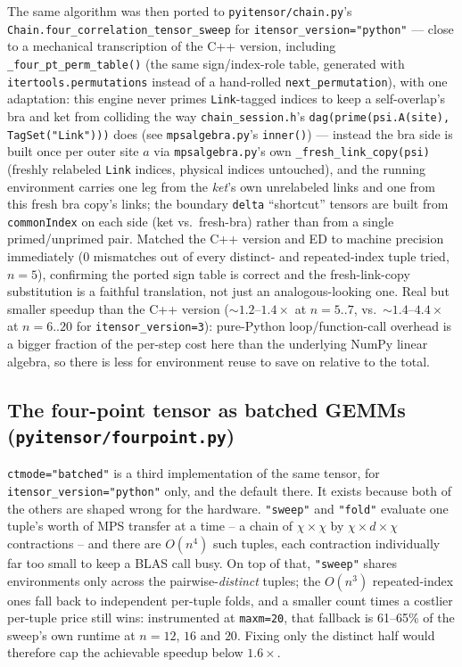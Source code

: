 \documentclass[11pt]{article}
\begin{document}
The same algorithm was then ported to \texttt{pyitensor/chain.py}'s
\texttt{Chain.four\_correlation\_tensor\_sweep} for
\texttt{itensor\_version="python"} --- close to a mechanical
transcription of the C++ version, including
\texttt{\_four\_pt\_perm\_table()} (the same sign/index-role table,
generated with \texttt{itertools.permutations} instead of a hand-rolled
\texttt{next\_permutation}), with one adaptation: this engine never
primes \texttt{Link}-tagged indices to keep a self-overlap's bra and ket
from colliding the way \texttt{chain\_session.h}'s
\texttt{dag(prime(psi.A(site), TagSet("Link")))} does (see
\texttt{mpsalgebra.py}'s \texttt{inner()}) --- instead the bra side is
built once per outer site $a$ via \texttt{mpsalgebra.py}'s own
\texttt{\_fresh\_link\_copy(psi)} (freshly relabeled \texttt{Link}
indices, physical indices untouched), and the running environment
carries one leg from the \emph{ket}'s own unrelabeled links and one from
this fresh bra copy's links; the boundary \texttt{delta} ``shortcut''
tensors are built from \texttt{commonIndex} on each side (ket vs.\
fresh-bra) rather than from a single primed/unprimed pair. Matched the
C++ version and ED to machine precision immediately (0 mismatches out of
every distinct- and repeated-index tuple tried, $n=5$), confirming the
ported sign table is correct and the fresh-link-copy substitution is a
faithful translation, not just an analogous-looking one. Real but
smaller speedup than the C++ version ($\sim1.2$--$1.4\times$ at
$n=5..7$, vs.\ $\sim1.4$--$4.4\times$ at $n=6..20$ for
\texttt{itensor\_version=3}): pure-Python loop/function-call overhead is
a bigger fraction of the per-step cost here than the underlying NumPy
linear algebra, so there is less for environment reuse to save on
relative to the total.

\subsection{The four-point tensor as batched GEMMs
(\texttt{pyitensor/fourpoint.py})}

\texttt{ctmode="batched"} is a third implementation of the same tensor, for
\texttt{itensor\_version="python"} only, and the default there. It exists
because both of the others are shaped wrong for the hardware.
\texttt{"sweep"} and \texttt{"fold"} evaluate one tuple's worth of MPS
transfer at a time -- a chain of $\chi\times\chi$ by $\chi\times d\times\chi$
contractions -- and there are $O(n^4)$ such tuples, each contraction
individually far too small to keep a BLAS call busy. On top of that,
\texttt{"sweep"} shares environments only across the pairwise-\emph{distinct}
tuples; the $O(n^3)$ repeated-index ones fall back to independent per-tuple
folds, and a smaller count times a costlier per-tuple price still wins:
instrumented at \texttt{maxm=20}, that fallback is 61--65\% of the sweep's
own runtime at $n=12$, $16$ and $20$. Fixing only the distinct half would
therefore cap the achievable speedup below $1.6\times$.
\end{document}
